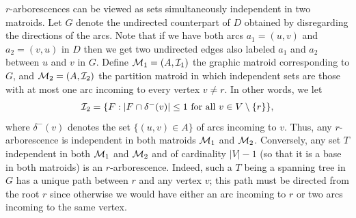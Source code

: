 $r$-arborescences can be viewed as sets simultaneously independent in two matroids. Let $G$ denote
the undirected counterpart of $D$ obtained by disregarding the directions of the arcs. Note that
if we have both arcs $a_1=(u,v)$ and $a_2=(v,u)$ in $D$ then we get two undirected edges also
labeled $a_1$ and $a_2$ between $u$ and $v$ in $G$. Define $\mathcal{M}_1=(A,\mathcal{I}_1)$ the graphic matroid
corresponding to $G$, and $\mathcal{M}_2=(A,\mathcal{I}_2)$ the partition matroid in which independent sets are
those with at most one arc incoming to every vertex $v\neq r$. In other words, we let
\[
  \mathcal{I}_2=\{F: |F\cap\delta^-(v)|\le 1 \text{ for all } v\in V\setminus\{r\}\},
\]
where $\delta^-(v)$ denotes the set $\{(u,v)\in A\}$ of arcs incoming to $v$. Thus, any
$r$-arborescence is independent in both matroids $\mathcal{M}_1$ and $\mathcal{M}_2$. Conversely, any set $T$
independent in both $\mathcal{M}_1$ and $\mathcal{M}_2$ and of cardinality $|V|-1$ (so that it is a base in both
matroids) is an $r$-arborescence. Indeed, such a $T$ being a spanning tree in $G$ has a unique path
between $r$ and any vertex $v$; this path must be directed from the root $r$ since otherwise we
would have either an arc incoming to $r$ or two arcs incoming to the same vertex.
% 
